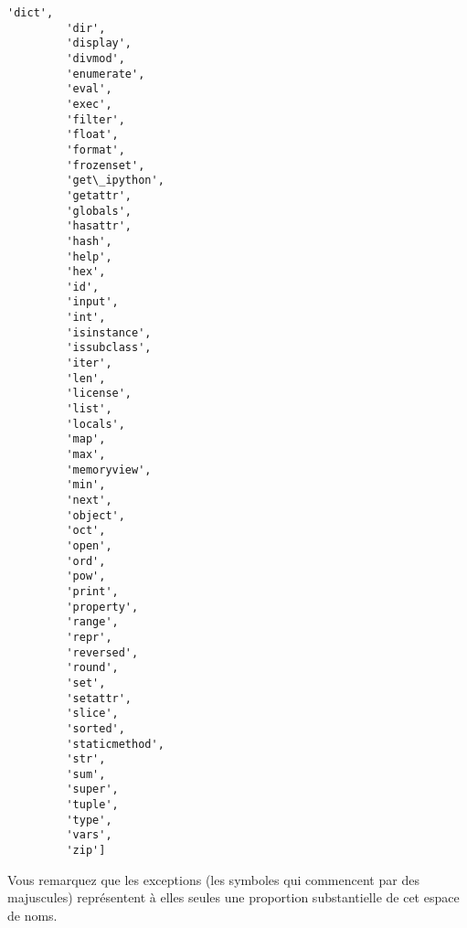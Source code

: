 \begin{Verbatim}[commandchars=\\\{\}]
         'dict',
         'dir',
         'display',
         'divmod',
         'enumerate',
         'eval',
         'exec',
         'filter',
         'float',
         'format',
         'frozenset',
         'get\_ipython',
         'getattr',
         'globals',
         'hasattr',
         'hash',
         'help',
         'hex',
         'id',
         'input',
         'int',
         'isinstance',
         'issubclass',
         'iter',
         'len',
         'license',
         'list',
         'locals',
         'map',
         'max',
         'memoryview',
         'min',
         'next',
         'object',
         'oct',
         'open',
         'ord',
         'pow',
         'print',
         'property',
         'range',
         'repr',
         'reversed',
         'round',
         'set',
         'setattr',
         'slice',
         'sorted',
         'staticmethod',
         'str',
         'sum',
         'super',
         'tuple',
         'type',
         'vars',
         'zip']
\end{Verbatim}
            
    Vous remarquez que les exceptions (les symboles qui commencent par des
majuscules) représentent à elles seules une proportion substantielle de
cet espace de noms.